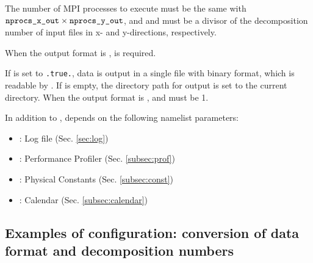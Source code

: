 The number of MPI processes to execute \sno must be the same with $\nmitemeq{nprocs_x_out} \times \nmitemeq{nprocs_y_out}$,
and  and  must be a divisor of the decomposition number
of input files in x- and y-directions, respectively.


When the output format is \scalenetcdf,  is required.


If  is set to \verb|.true.|, data is output in a single file with binary format,
which is readable by \grads.
If  is empty, the directory path for output is set to the current directory.
When the output format is \grads,  and  must be 1.


In addition to , \sno depends on the following namelist parameters:
%
\begin{itemize}
 \item {}: Log file (Sec. \ref{sec:log})
 \item {}: Performance Profiler (Sec. \ref{subsec:prof})
 \item {}: Physical Constants (Sec. \ref{subsec:const})
 \item {}: Calendar (Sec. \ref{subsec:calendar})
\end{itemize}



\subsection{Examples of configuration: conversion of data format and decomposition numbers}

